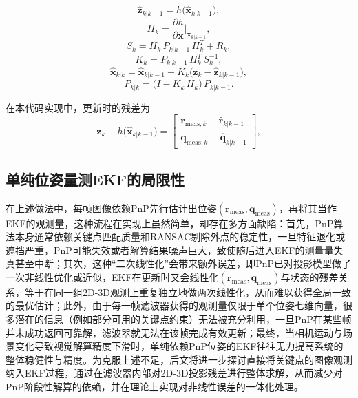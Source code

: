 \begin{equation}
	\hat{\mathbf{z}}_{k|k-1} = h\bigl(\hat{\mathbf{x}}_{k|k-1}\bigr),
\end{equation}
\begin{equation}
	\label{eq:Hk}
	H_k = \frac{\partial h}{\partial \mathbf{x}}\Bigg|_{\hat{\mathbf{x}}_{k|k-1}},
\end{equation}
\begin{equation}
	S_k = H_k\, P_{k|k-1}\, H_k^T + R_k,
\end{equation}
\begin{equation}
	K_k = P_{k|k-1} \, H_k^T \, S_k^{-1},
\end{equation}
\begin{equation}
	\hat{\mathbf{x}}_{k|k} = \hat{\mathbf{x}}_{k|k-1} + K_k \bigl(\mathbf{z}_k - \hat{\mathbf{z}}_{k|k-1}\bigr),
\end{equation}
\begin{equation}
	\label{eq:P_update}
	P_{k|k} = \bigl(I - K_k\,H_k\bigr)\,P_{k|k-1}.
\end{equation}

在本代码实现中，更新时的残差为
\begin{equation}
	\mathbf{z}_k - h\bigl(\hat{\mathbf{x}}_{k|k-1}\bigr)
	=
	\begin{bmatrix}
		\mathbf{r}_{\text{meas},k} - \hat{\mathbf{r}}_{k|k-1}\\
		\mathbf{q}_{\text{meas},k} - \hat{\mathbf{q}}_{k|k-1}
	\end{bmatrix},
\end{equation}


\subsection{单纯位姿量测EKF的局限性}
\label{sec:limitations_pose_ekf}

在上述做法中，每帧图像依赖PnP先行估计出位姿$(\mathbf{r}_{\mathrm{meas}}, \mathbf{q}_{\mathrm{meas}})$，再将其当作EKF的观测量，这种流程在实现上虽然简单，却存在多方面缺陷：首先，PnP算法本身通常依赖关键点匹配质量和RANSAC剔除外点的稳定性，一旦特征退化或遮挡严重，PnP可能失效或者解算结果噪声巨大，致使随后进入EKF的测量量失真甚至中断；其次，这种“二次线性化”会带来额外误差，即PnP已对投影模型做了一次非线性优化或近似，EKF在更新时又会线性化$(\mathbf{r}_{\mathrm{meas}}, \mathbf{q}_{\mathrm{meas}})$与状态的残差关系，等于在同一组2D-3D观测上重复独立地做两次线性化，从而难以获得全局一致的最优估计；此外，由于每一帧滤波器获得的观测量仅限于单个位姿七维向量，很多潜在的信息（例如部分可用的关键点约束）无法被充分利用，一旦PnP在某些帧并未成功返回可靠解，滤波器就无法在该帧完成有效更新；最终，当相机运动与场景变化导致视觉解算精度下滑时，单纯依赖PnP位姿的EKF往往无力提高系统的整体稳健性与精度。为克服上述不足，后文将进一步探讨直接将关键点的图像观测纳入EKF过程，通过在滤波器内部对2D-3D投影残差进行整体求解，从而减少对PnP阶段性解算的依赖，并在理论上实现对非线性误差的一体化处理。


